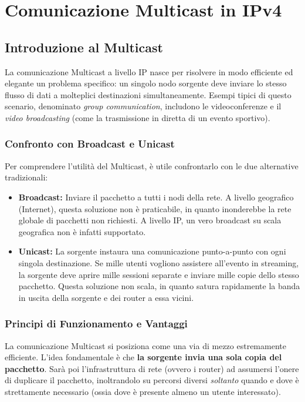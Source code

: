 \chapter{Comunicazione Multicast in IPv4}

\section{Introduzione al Multicast}

La comunicazione Multicast a livello IP nasce per risolvere in modo efficiente ed elegante un problema specifico: un singolo nodo sorgente deve inviare lo stesso flusso di dati a molteplici destinazioni simultaneamente. Esempi tipici di questo scenario, denominato \textit{group communication}, includono le videoconferenze e il \textit{video broadcasting} (come la trasmissione in diretta di un evento sportivo).

\subsection{Confronto con Broadcast e Unicast}
Per comprendere l'utilità del Multicast, è utile confrontarlo con le due alternative tradizionali:
\begin{itemize}
    \item \textbf{Broadcast:} Inviare il pacchetto a tutti i nodi della rete. A livello geografico (Internet), questa soluzione non è praticabile, in quanto inonderebbe la rete globale di pacchetti non richiesti. A livello IP, un vero broadcast su scala geografica non è infatti supportato.
    \item \textbf{Unicast:} La sorgente instaura una comunicazione punto-a-punto con ogni singola destinazione. Se mille utenti vogliono assistere all'evento in streaming, la sorgente deve aprire mille sessioni separate e inviare mille copie dello stesso pacchetto. Questa soluzione non scala, in quanto satura rapidamente la banda in uscita della sorgente e dei router a essa vicini.
\end{itemize}

\subsection{Principi di Funzionamento e Vantaggi}
La comunicazione Multicast si posiziona come una via di mezzo estremamente efficiente. L'idea fondamentale è che \textbf{la sorgente invia una sola copia del pacchetto}. Sarà poi l'infrastruttura di rete (ovvero i router) ad assumersi l'onere di duplicare il pacchetto, inoltrandolo su percorsi diversi \textit{soltanto} quando e dove è strettamente necessario (ossia dove è presente almeno un utente interessato).

